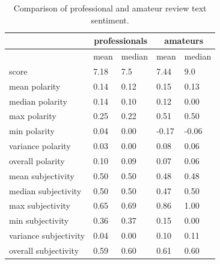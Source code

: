 \documentclass[letterpaper]{article}
\begin{document}
\begin{table}[tb]
\small
\sffamily
\begin{tabularx}{\linewidth}{lXXXX}
& \multicolumn{2}{c}{\textbf{professionals}} & \multicolumn{2}{c}{\textbf{amateurs}}  \\ 
\midrule & mean & median & mean & median \\ 

score & 7.18 & 7.5 & 7.44 & 9.0 \\ 

mean polarity & 0.14 & 0.12 & 0.15 & 0.13 \\ 
median polarity & 0.14 & 0.10 & 0.12 & 0.00 \\ 
max polarity & 0.25 & 0.22 & 0.51 & 0.50 \\ 
min polarity & 0.04 & 0.00 & -0.17 & -0.06 \\ 
variance polarity & 0.03 & 0.00 & 0.08 & 0.06 \\ 
overall polarity & 0.10 & 0.09 & 0.07 & 0.06 \\ 

mean subjectivity & 0.50 & 0.50 & 0.48 & 0.48 \\ 
median subjectivity & 0.50 & 0.50 & 0.47 & 0.50 \\ 
max subjectivity & 0.65 & 0.69 & 0.86 & 1.00 \\ 
min subjectivity & 0.36 & 0.37 & 0.15 & 0.00 \\ 
variance subjectivity & 0.04 & 0.00 & 0.10 & 0.11 \\ 
overall subjectivity & 0.59 & 0.60 & 0.61 & 0.60 \\ 

\end{tabularx}
\caption{Comparison of professional and amateur review text sentiment.}
\label{tab:review_pol_subj}
\end{table}
\end{document}
